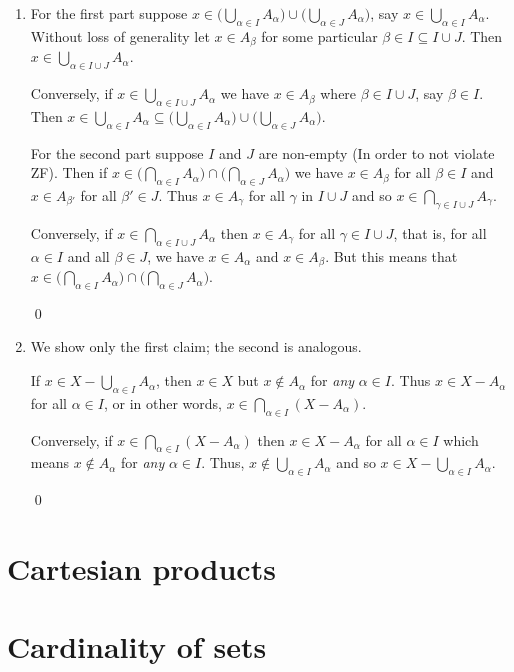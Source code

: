 \begin{enumerate}[Ex. 3.4.1.]
    The equality (3.4) holds for the same reason.

    \qed

    \item For the first part suppose $x \in \big(\bigcup_{\alpha\in I} A_\alpha\big)
    \cup \big(\bigcup_{\alpha\in J} A_\alpha\big)$, say $x\in\bigcup_{\alpha\in I} 
    A_\alpha$. Without loss of generality let $x\in A_\beta$ for some particular
    $\beta\in I \subseteq I \cup J$. Then $x \in \bigcup_{\alpha\in I\cup J} A_\alpha$.

    Conversely, if $x \in \bigcup_{\alpha\in I\cup J} A_\alpha$ we have $x\in A_\beta$
    where $\beta \in I \cup J$, say $\beta \in I$. Then $x\in 
    \bigcup_{\alpha\in I} A_\alpha \subseteq \big(\bigcup_{\alpha\in I} 
    A_\alpha\big) \cup \big(\bigcup_{\alpha\in J} A_\alpha\big)$.

    For the second part suppose $I$ and $J$ are non-empty (In order to not violate
    ZF). Then if $x\in \big(\bigcap_{\alpha\in I} A_\alpha\big) \cap 
    \big(\bigcap_{\alpha\in J} A_\alpha\big)$ we have $x \in A_\beta$ for all
    $\beta \in I$ and $x\in A_{\beta'}$ for all $\beta' \in J$. Thus $x\in A_\gamma$
    for all $\gamma$ in $I \cup J$ and so $x\in \bigcap_{\gamma\in I\cup J}
    A_\gamma$.

    Conversely, if $x\in \bigcap_{\alpha\in I\cup J} A_\alpha$ then $x\in A_\gamma$
    for all $\gamma \in I\cup J$, that is, for all $\alpha \in I$ and all 
    $\beta\in J$, we have $x\in A_\alpha$ and $x\in A_\beta$. But this means
    that $x \in \big(\bigcap_{\alpha\in I} A_\alpha\big) \cap 
    \big(\bigcap_{\alpha\in J} A_\alpha\big)$.

    \qed

    \item We show only the first claim; the second is analogous.

    If $x \in X - \bigcup_{\alpha \in I} A_\alpha$, then $x \in X$ but
    $x \not\in A_\alpha$ for \emph{any} $\alpha\in I$. Thus $x\in X - A_\alpha$
    for all $\alpha \in I$, or in other words, $x\in\bigcap_{\alpha\in I}
    (X-A_\alpha)$.

    Conversely, if $x \in \bigcap_{\alpha \in I}(X - A_\alpha)$ then
    $x \in X - A_\alpha$ for all $\alpha \in I$ which means $x \not\in A_\alpha$
    for \emph{any} $\alpha \in I$. Thus, $x\not\in\bigcup_{\alpha\in I} A_\alpha$
    and so $x \in X - \bigcup_{\alpha \in I} A_\alpha$.

    \qed
\end{enumerate}


\section{Cartesian products}


\section{Cardinality of sets}
